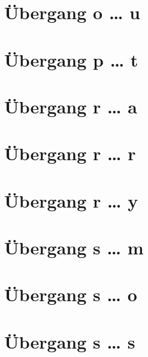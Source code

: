 \documentclass[a4paper,landscape]{article}
\begin{document}
\hspace*{-1ex}
\newpage

\section{Übergang o … u }

\hspace*{-1ex}
\newpage

\section{Übergang p … t }

\hspace*{-1ex}
\newpage

\section{Übergang r … a }

\hspace*{-1ex}
\newpage

\section{Übergang r … r }

\hspace*{-1ex}
\newpage

\section{Übergang r … y }

\hspace*{-1ex}
\newpage

\section{Übergang s … m }

\hspace*{-1ex}
\newpage

\section{Übergang s … o }

\hspace*{-1ex}
\newpage

\section{Übergang s … s }
\end{document}
